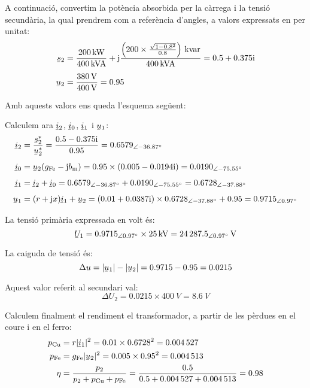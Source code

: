 \begin{exemple}
        A continuació, convertim la potència absorbida per la càrrega i la tensió secundària, la qual prendrem com a referència d'angles,  a valors expressats en per unitat:
  \begin{align*}
    \cmplx{s}_2 &= \frac{\qty{200}{kW}}{\qty{400}{kVA}} + \ju \frac{\left(200\times \frac{\sqrt{1-\num{0,8}^2}}{\num{0,8}}\right)\unit{\,kvar}}{\qty{400}{kVA}} =
    \complexnum{0,5 + j 0,375}\\[1ex]
    \cmplx{u}_2 &= \frac{\qty{380}{V}}{\qty{400}{V}} = \num{0,95}
  \end{align*}

    Amb aquests valors ens queda l'esquema següent:

    \begin{center}
        
    \end{center}

    Calculem ara $\cmplx{i}_2$, $\cmplx{i}_0$, $\cmplx{i}_1$ i $\cmplx{u}_1$:
    \begin{align*}
    \cmplx{i}_2 &= \frac{\cmplx{s}_2^*}{\cmplx{u}_2^*} = \frac{\complexnum{0,5 - j 0,375}}{\num{0,95}} = \numpd{0,6579}{-36,87} \\[1ex]
    \cmplx{i}_0 &= \cmplx{u}_2 (g\ped{Fe}-\ju b\ped{m}) = \num{0,95}\times(\complexnum{0,005-j0,0194}) = \numpd{0,0190}{-75,55} \\[1ex]
    \cmplx{i}_1 &= \cmplx{i}_2 + \cmplx{i}_0 =\numpd{0,6579}{-36,87} +\numpd{0,0190}{-75,55} = \numpd{0,6728}{-37,88} \\[1ex]
    \cmplx{u}_1 &=(r+\ju x) \cmplx{i}_1 + \cmplx{u}_2 = (\complexnum{0,01+j 0,0387}) \times \numpd{0,6728}{-37,88} + \num{0,95} =
    \numpd{0,9715}{0,97}
  \end{align*}

  La tensió primària expressada en volt és:
  \[
    \cmplx{U}_1 = \numpd{0,9715}{0,97}\times \qty{25}{kV} = \qtypd{24287,5}{0,97}{V}
  \]

   La caiguda de tensió és:
   \[
        \Delta u = |\cmplx{u}_1| - |\cmplx{u}_2| = \num{0,9715} - \num{0,95} = \num{0,0215}
   \]

   Aquest valor referit al secundari val:
   \[
        \Delta U_2 =\num{0,0215}\times \qty{400}{V} = \qty{8,6}{V}
   \]

   Calculem finalment el rendiment el transformador, a partir de les pèrdues en el coure  i en el ferro:
   \begin{align*}
    p\ped{Cu} &= r |\cmplx{i}_1|^2  = \num{0,01}\times \num{0,6728}^2 = \num{0,004527}\\
    p\ped{Fe} &= g\ped{Fe} |\cmplx{u}_2|^2 = \num{0,005}\times \num{0,95}^2 = \num{0,004513}\\
    \eta &= \frac{p_2}{p_2 + p\ped{Cu} + p\ped{Fe}} = \frac{\num{0,5}}{\num{0,5} + \num{0,004527} + \num{0,004513} } = \num{0,98}
  \end{align*}

\end{exemple}

